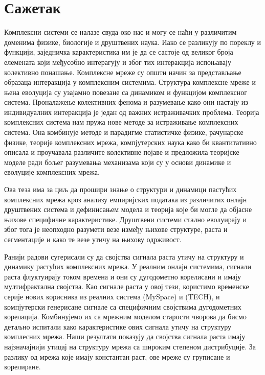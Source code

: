 \normalsize


\sffamily
{}\selectfont

\chapter*{{\selectfont Сажетак}}

Комплексни системи се налазе свуда око нас и могу се наћи у различитим доменима физике, биологије и друштвених наука. Иако се разликују по пореклу и функцији, заједничка карактеристика им је да се састоје од великог броја елемената који међусобно интерагују и због тих интеракција испоњавају колективно понашање. Комплексне мреже су општи начин за представљање образаца интеракција у комплексним системима. Структура комплексне мреже и њена еволуција су узајамно повезане са динамиком и функцијом комплексног система. Проналажење колективних фенома и разумевање како они настају из индивидуалних интеракција је један од важних истраживачких проблема. Теорија комплексних система нам пружа нове методе за истраживање комплексних система. Она комбинује методе и парадигме статистичке физике, рачунарске физике, теорије комплексних мрежа, компјутерских наука како би квантитативно описала и проучавала различите колективне појаве и предложила теоријске моделе ради бољег разумевања механизама који су у основи динамике и еволуције комплексних мрежа. 

Ова теза има за циљ да прошири знање о структури и динамици пастућих комплексних мрежа кроз анализу емпиријских података из различитих онлајн друштвених система и дефинисањем модела и теорија које би могле да објасне њихове специфичне карактеристике. Друштвени системи стално еволуирају и због тога је неопходно разумети везе између њихове структуре, раста и сегментације и како те везе утичу на њихову одрживост.

Ранији радови сугерисали су да својства сигнала раста утичу на структуру и динамику растућих комплексних мрежа. У реалним онлајн системима, сигнали раста флуктуирају током времена и они су дугодометно корелисани и имају мултифрактална својства. Као сигнале раста у овој тези, користимо временске серије нових корисника из реалних система {(MySpace)} и {(TECH)}, и компјутерски генерисане сигнале са специфичним својствима дугодометних корелација. Комбинујемо их са мрежним моделом старости чворова да бисмо детаљно испитали како карактеристике ових сигнала утичу на структуру комплесних мрежа. Наши резултати показују да својства сигнала раста имају најзначајнији утицај на структуру мрежа са широким степеном дистрибуције. За разлику од мрежа које имају константан раст, ове мреже су груписане и корелиране.

